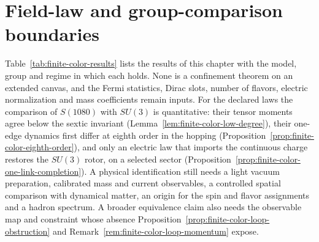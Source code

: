 \section{Field-law and group-comparison boundaries}

Table~\ref{tab:finite-color-results} lists the results of this chapter
with the model, group and regime in which each holds. None is a
confinement theorem on an extended canvas, and the Fermi statistics,
Dirac slots, number of flavors, electric normalization and mass
coefficients remain inputs. For the declared laws the comparison of
$S(1080)$ with $SU(3)$ is quantitative: their tensor moments agree below
the sextic invariant (Lemma~\ref{lem:finite-color-low-degree}), their
one-edge dynamics first differ at eighth order in the hopping
(Proposition~\ref{prop:finite-color-eighth-order}), and only an electric
law that imports the continuous charge restores the $SU(3)$ rotor, on a
selected sector (Proposition~\ref{prop:finite-color-one-link-completion}).
A physical identification still needs a light vacuum preparation,
calibrated mass and current observables, a controlled spatial comparison
with dynamical matter, an origin for the spin and flavor assignments and
a hadron spectrum. A broader equivalence claim also needs the observable
map and constraint whose absence
Proposition~\ref{prop:finite-color-loop-obstruction} and
Remark~\ref{rem:finite-color-loop-momentum} expose.


